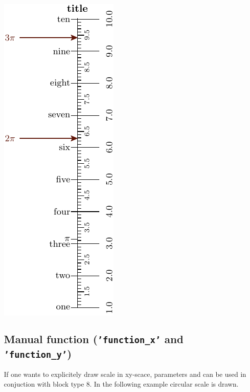 \documentclass[a4paper,11pt,english]{sphinxmanual}
\begin{document}
\includegraphics{ex_axes_7_1.pdf}


\subsection{Manual function  (\texttt{'function\_x'} and \texttt{'function\_y'})}
\label{axes/axes:manual-function-function-x-and-function-y}
If one wants to explicitely draw scale in xy-scace, parameters  and  can be used
in conjuction with block type 8. In the following example circular scale is drawn.
\end{document}
